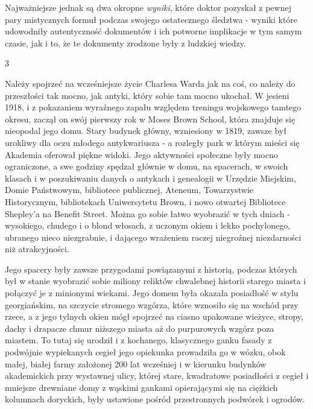Najważniejsze jednak są dwa okropne \textit{wyniki}, które doktor pozyskał z pewnej pary mistycznych formuł podczas swojego ostatecznego śledztwa - wyniki które udowodniły autentyczność dokumentów i ich potworne implikacje w tym samym czasie, jak i to, że te dokumenty zrodzone były z ludzkiej wiedzy.

\begin{center}
3
\end{center}

Należy spojrzeć na wcześniejsze życie Charlesa Warda jak na coś, co należy do przeszłości tak mocno, jak antyki, który sobie tam mocno ukochał. W jesieni 1918, i z pokazaniem wyraźnego zapału względem treningu wojskowego tamtego okresu, zaczął on swój pierwszy rok w Moses Brown School, która znajduje się nieopodal jego domu. Stary budynek główny, wzniesiony w 1819, zawsze był urokliwy dla oczu młodego antykwariusza - a rozległy park w którym mieści się Akademia oferował piękne widoki. Jego aktywności społeczne były mocno ograniczone, a swe godziny spędzał głównie w domu, na spacerach, w swoich klasach i w poszukiwaniu danych o antykach i genealogii w Urzędzie Miejskim, Domie Państwowym, bibliotece publicznej, Ateneum, Towarzystwie Historycznym, bibliotekach Uniwersytetu Brown, i nowo otwartej Bibliotece Shepley'a na Benefit Street. Można go sobie łatwo wyobrazić w tych dniach - wysokiego, chudego i o blond włosach, z uczonym okiem i lekko pochylonego, ubranego nieco niezgrabnie, i dającego wrażeniem raczej niegroźnej niezdarności niż atrakcyjności. 

Jego spacery były zawsze przygodami powiązanymi z historią, podczas których był w stanie wyobrazić sobie miliony reliktów chwalebnej historii starego miasta i połączyć je z minionymi wiekami. Jego domem była okazała posiadłość w stylu georgiańskim, na szczycie stromego wzgórza, które wznosiło się na wschód przy rzece, a z jego tylnych okien mógł spojrzeć na ciasno upakowane wieżyce, stropy, dachy i drapacze chmur niższego miasta aż do purpurowych wzgórz poza miastem. To tutaj się urodził i z kochanego, klasycznego ganku fasady z podwójnie wypiekanych cegieł jego opiekunka prowadziła go w wózku, obok małej, białej farmy założonej 200 lat wcześniej i w kierunku budynków akademickich przy wystawnej ulicy, której stare, kwadratowe posiadłości z cegieł i mniejsze drewniane domy z wąskimi gankami opierającymi się na ciężkich kolumnach doryckich, były ustawione pośród przestronnych podwórek i ogrodów.

